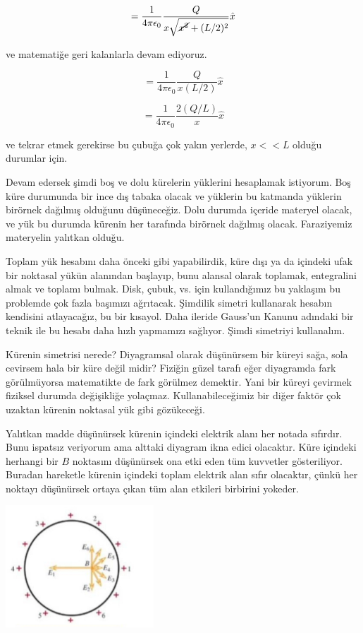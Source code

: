 \documentclass[12pt,fleqn]{article}\usepackage{../../common}
\begin{document}
$$
 = \frac{1}{4\pi\epsilon_0} \frac{Q}{x \sqrt{\cancel{x^2} + (L/2)^2}} \hat{x}
$$

ve matematiğe geri kalanlarla devam ediyoruz. 
 
$$
 = \frac{1}{4\pi\epsilon_0} \frac{Q}{x (L/2)} \hat{x}
$$

$$
 = \frac{1}{4\pi\epsilon_0} \frac{2(Q/L)}{x} \hat{x}
$$

ve tekrar etmek gerekirse bu çubuğa çok yakın yerlerde, $x << L$ olduğu durumlar
için.

Devam edersek şimdi boş ve dolu kürelerin yüklerini hesaplamak istiyorum. Boş
küre durumunda bir ince dış tabaka olacak ve yüklerin bu katmanda yüklerin
birörnek dağılmış olduğunu düşüneceğiz. Dolu durumda içeride materyel olacak, ve
yük bu durumda kürenin her tarafında birörnek dağılmış olacak. Faraziyemiz
materyelin yalıtkan olduğu.

Toplam yük hesabını daha önceki gibi yapabilirdik, küre dışı ya da içindeki ufak
bir noktasal yükün alanından başlayıp, bunu alansal olarak toplamak, entegralini
almak ve toplamı bulmak. Disk, çubuk, vs. için kullandığımız bu yaklaşım bu
problemde çok fazla başımızı ağrıtacak. Şimdilik simetri kullanarak hesabın
kendisini atlayacağız, bu bir kısayol. Daha ileride Gauss'un Kanunu adındaki bir
teknik ile bu hesabı daha hızlı yapmamızı sağlıyor. Şimdi simetriyi kullanalım.

Kürenin simetrisi nerede? Diyagramsal olarak düşünürsem bir küreyi sağa, sola
cevirsem hala bir küre değil midir? Fiziğin güzel tarafı eğer diyagramda fark
görülmüyorsa matematikte de fark görülmez demektir. Yani bir küreyi çevirmek
fiziksel durumda değişikliğe yolaçmaz. Kullanabileceğimiz bir diğer faktör çok
uzaktan kürenin noktasal yük gibi gözükeceği.

Yalıtkan madde düşünürsek kürenin içindeki elektrik alanı her notada
sıfırdır. Bunu ispatsız veriyorum ama alttaki diyagram ikna edici
olacaktır. Küre içindeki herhangi bir $B$ noktasını düşünürsek ona etki eden tüm
kuvvetler gösteriliyor. Buradan hareketle kürenin içindeki toplam elektrik alan
sıfır olacaktır, çünkü her noktayı düşünürsek ortaya çıkan tüm alan etkileri
birbirini yokeder.

\includegraphics[width=15em]{07_02.jpg}
\end{document}
